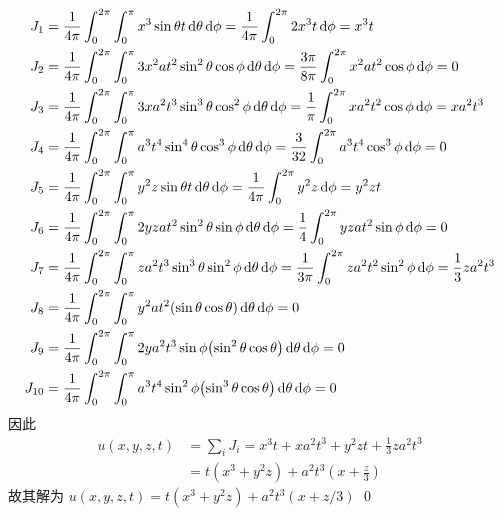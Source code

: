 \[ \begin{aligned}
J_1 &= \frac{1}{4\pi} \int_0^{2\pi} \int_0^\pi
	x^3 \sin\theta t
	\diff\theta \diff\phi 
	= \frac{1}{4\pi} \int_0^{2\pi} 2x^3t \diff\phi = x^3t \\
J_2 &= \frac{1}{4\pi} \int_0^{2\pi} \int_0^\pi
	3x^2 at^2\sin^2\theta \cos\phi
	\diff\theta \diff\phi 
	= \frac{3\pi}{8\pi} \int_0^{2\pi} x^2at^2 \cos\phi \diff\phi = 0 \\
J_3 &= \frac{1}{4\pi} \int_0^{2\pi} \int_0^\pi
	3x a^2t^3\sin^3\theta \cos^2\phi
	\diff\theta \diff\phi 
	= \frac{1}{\pi} \int_0^{2\pi} xa^2t^2 \cos\phi \diff\phi = xa^2t^3 \\
J_4 &= \frac{1}{4\pi} \int_0^{2\pi} \int_0^\pi
	a^3t^4\sin^4\theta \cos^3\phi
	\diff\theta \diff\phi 
	= \frac{3}{32} \int_0^{2\pi} a^3t^4 \cos^3\phi \diff\phi = 0 \\
J_5 &= \frac{1}{4\pi} \int_0^{2\pi} \int_0^\pi
	y^2z \sin\theta t
	\diff\theta \diff\phi 
	= \frac{1}{4\pi} \int_0^{2\pi} y^2z \diff\phi = y^2zt \\
J_6 &= \frac{1}{4\pi} \int_0^{2\pi} \int_0^\pi
	2yzat^2\sin^2\theta \sin\phi
	\diff\theta \diff\phi 
	= \frac{1}{4} \int_0^{2\pi} yzat^2 \sin\phi \diff\phi = 0 \\
J_7 &= \frac{1}{4\pi} \int_0^{2\pi} \int_0^\pi
	za^2t^3\sin^3\theta \sin^2\phi
	\diff\theta \diff\phi 
	= \frac{1}{3\pi} \int_0^{2\pi} za^2t^2 \sin^2\phi \diff\phi = \frac13za^2t^3 \\
J_8 &= \frac{1}{4\pi} \int_0^{2\pi} \int_0^\pi
	y^2at^2\mclosure{\sin\theta\cos\theta}
	\diff\theta \diff\phi = 0 \\
J_9 &= \frac{1}{4\pi} \int_0^{2\pi} \int_0^\pi
	2ya^2t^3 \sin\phi \mclosure{\sin^2\theta \cos\theta}
	\diff\theta \diff\phi = 0 \\
J_{10} &= \frac{1}{4\pi} \int_0^{2\pi} \int_0^\pi
	a^3t^4 \sin^2\phi \mclosure{\sin^3\theta \cos\theta}
	\diff\theta \diff\phi = 0 \\
\end{aligned} \]
因此
\[ \begin{aligned}
u(x, y, z, t) &= \sum_i J_i = x^3t + xa^2t^3 + y^2zt + \frac13za^2t^3 \\
&= t(x^3 + y^2z) + a^2t^3(x + \frac{z}{3})
\end{aligned} \]
故其解为 $u(x, y, z, t) = t(x^3 + y^2z) + a^2t^3(x + z/3)$
\qed
